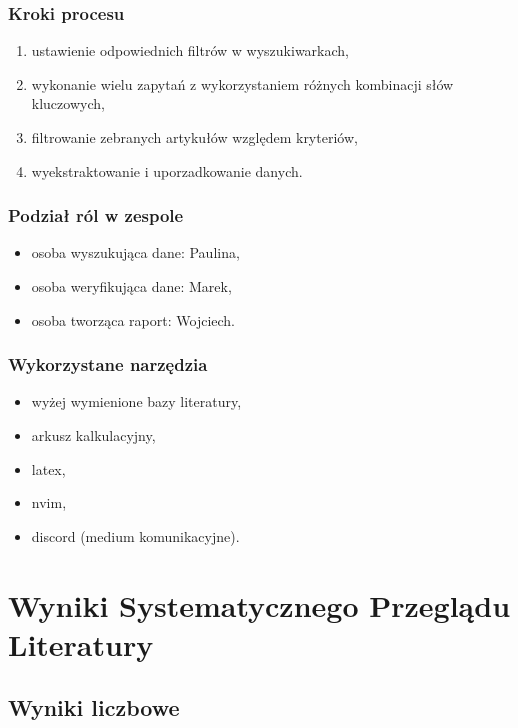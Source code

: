 \documentclass[polish,envcountsect,10pt]{article}
\begin{document}
\subsubsection{Kroki procesu}

\begin{enumerate}
	\item ustawienie odpowiednich filtrów w wyszukiwarkach,
	\item wykonanie wielu zapytań z wykorzystaniem różnych kombinacji słów kluczowych,
	\item filtrowanie zebranych artykułów względem kryteriów,
	\item wyekstraktowanie i uporzadkowanie danych.
\end{enumerate}

\subsubsection{Podział ról w zespole}

\begin{itemize}
	\item osoba wyszukująca dane: Paulina,
	\item osoba weryfikująca dane: Marek,
	\item osoba tworząca raport: Wojciech.
\end{itemize}

\subsubsection{Wykorzystane narzędzia}

\begin{itemize}
	\item wyżej wymienione bazy literatury,
	\item arkusz kalkulacyjny,
	\item latex,
	\item nvim,
	\item discord (medium komunikacyjne).
\end{itemize}

\section{Wyniki Systematycznego Przeglądu Literatury}

\subsection{Wyniki liczbowe}
\end{document}

